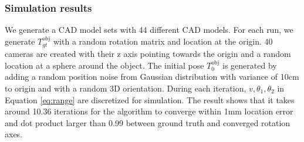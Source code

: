 \subsubsection{Simulation results}

We generate a CAD model sets with 44 different CAD models. For each run, we generate $T^{\text{obj}}_{gt}$ with a random rotation matrix and location at the origin. 40 cameras are created with their z axis pointing towards the origin and a random location at a sphere around the object. The initial pose $T^{\text{obj}}_{0}$ is generated by adding a random position noise from Gaussian distribution with variance of 10cm to origin and with a random 3D orientation. During each iteration, $v, \theta_1, \theta_2$ in Equation \ref{eq:range} are discretized for simulation. The result shows that it takes around 10.36 iterations for the algorithm to converge within 1mm location error and dot product larger than 0.99 between ground truth and converged rotation axes.
